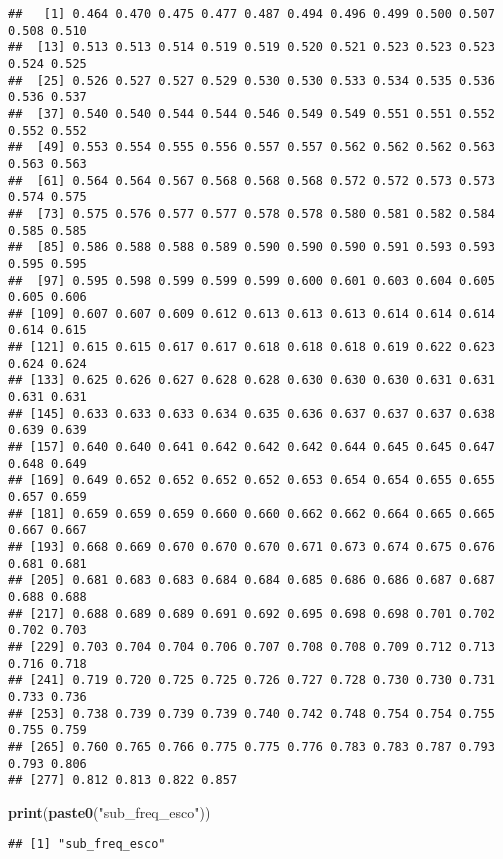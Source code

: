 \documentclass[
]{article}
\newenvironment{Shaded}{\begin{snugshade}}{\end{snugshade}}
\newcommand{\FunctionTok}[1]{\textcolor[rgb]{0.13,0.29,0.53}{\textbf{#1}}}
\newcommand{\NormalTok}[1]{#1}
\newcommand{\StringTok}[1]{\textcolor[rgb]{0.31,0.60,0.02}{#1}}
\begin{document}
\begin{verbatim}
##   [1] 0.464 0.470 0.475 0.477 0.487 0.494 0.496 0.499 0.500 0.507 0.508 0.510
##  [13] 0.513 0.513 0.514 0.519 0.519 0.520 0.521 0.523 0.523 0.523 0.524 0.525
##  [25] 0.526 0.527 0.527 0.529 0.530 0.530 0.533 0.534 0.535 0.536 0.536 0.537
##  [37] 0.540 0.540 0.544 0.544 0.546 0.549 0.549 0.551 0.551 0.552 0.552 0.552
##  [49] 0.553 0.554 0.555 0.556 0.557 0.557 0.562 0.562 0.562 0.563 0.563 0.563
##  [61] 0.564 0.564 0.567 0.568 0.568 0.568 0.572 0.572 0.573 0.573 0.574 0.575
##  [73] 0.575 0.576 0.577 0.577 0.578 0.578 0.580 0.581 0.582 0.584 0.585 0.585
##  [85] 0.586 0.588 0.588 0.589 0.590 0.590 0.590 0.591 0.593 0.593 0.595 0.595
##  [97] 0.595 0.598 0.599 0.599 0.599 0.600 0.601 0.603 0.604 0.605 0.605 0.606
## [109] 0.607 0.607 0.609 0.612 0.613 0.613 0.613 0.614 0.614 0.614 0.614 0.615
## [121] 0.615 0.615 0.617 0.617 0.618 0.618 0.618 0.619 0.622 0.623 0.624 0.624
## [133] 0.625 0.626 0.627 0.628 0.628 0.630 0.630 0.630 0.631 0.631 0.631 0.631
## [145] 0.633 0.633 0.633 0.634 0.635 0.636 0.637 0.637 0.637 0.638 0.639 0.639
## [157] 0.640 0.640 0.641 0.642 0.642 0.642 0.644 0.645 0.645 0.647 0.648 0.649
## [169] 0.649 0.652 0.652 0.652 0.652 0.653 0.654 0.654 0.655 0.655 0.657 0.659
## [181] 0.659 0.659 0.659 0.660 0.660 0.662 0.662 0.664 0.665 0.665 0.667 0.667
## [193] 0.668 0.669 0.670 0.670 0.670 0.671 0.673 0.674 0.675 0.676 0.681 0.681
## [205] 0.681 0.683 0.683 0.684 0.684 0.685 0.686 0.686 0.687 0.687 0.688 0.688
## [217] 0.688 0.689 0.689 0.691 0.692 0.695 0.698 0.698 0.701 0.702 0.702 0.703
## [229] 0.703 0.704 0.704 0.706 0.707 0.708 0.708 0.709 0.712 0.713 0.716 0.718
## [241] 0.719 0.720 0.725 0.725 0.726 0.727 0.728 0.730 0.730 0.731 0.733 0.736
## [253] 0.738 0.739 0.739 0.739 0.740 0.742 0.748 0.754 0.754 0.755 0.755 0.759
## [265] 0.760 0.765 0.766 0.775 0.775 0.776 0.783 0.783 0.787 0.793 0.793 0.806
## [277] 0.812 0.813 0.822 0.857
\end{verbatim}

\begin{Shaded}
\begin{Highlighting}[]
\FunctionTok{print}\NormalTok{(}\FunctionTok{paste0}\NormalTok{(}\StringTok{"sub\_freq\_esco"}\NormalTok{))}
\end{Highlighting}
\end{Shaded}

\begin{verbatim}
## [1] "sub_freq_esco"
\end{verbatim}
\end{document}
